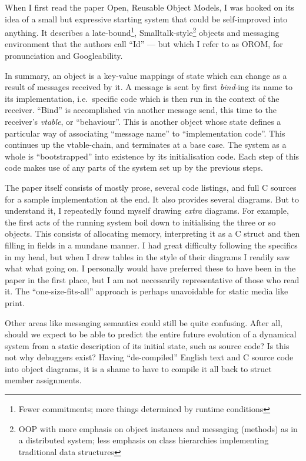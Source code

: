 \documentclass[english,submission]{programming}
\begin{document}
  When I first read the paper Open, Reusable Object Models, I was hooked
  on its idea of a small but expressive starting system that could be
  self-improved into anything. It describes a late-bound\footnote{Fewer
    commitments; more things determined by runtime conditions},
  Smalltalk-style\footnote{OOP with more emphasis on object instances and
    messaging (methods) as in a distributed system; less emphasis on class
    hierarchies implementing traditional data structures} objects and
  messaging environment that the authors call ``Id'' --- but which I refer
  to as OROM, for pronunciation and Googleability.

  In summary, an object is a key-value mappings of state which can change
  as a result of messages received by it. A message is sent by first
  \emph{bind}-ing its name to its implementation, i.e.~specific code which
  is then run in the context of the receiver. ``Bind'' is accomplished via
  another message send, this time to the receiver's \emph{vtable}, or
  ``behaviour''. This is another object whose state defines a particular
  way of associating ``message name'' to ``implementation code''. This
  continues up the vtable-chain, and terminates at a base case. The system
  as a whole is ``bootstrapped'' into existence by its initialisation
  code. Each step of this code makes use of any parts of the system set up
  by the previous steps.

  The paper itself consists of mostly prose, several code listings, and
  full C sources for a sample implementation at the end. It also provides
  several diagrams. But to understand it, I repeatedly found myself
  drawing \emph{extra} diagrams. For example, the first acts of the
  running system boil down to initialising the three or so objects. This
  consists of allocating memory, interpreting it as a C struct and then
  filling in fields in a mundane manner. I had great difficulty following
  the specifics in my head, but when I drew tables in the style of their
  diagrams I readily saw what what going on. I personally would have
  preferred these to have been in the paper in the first place, but I am
  not necessarily representative of those who read it. The
  ``one-size-fits-all'' approach is perhaps unavoidable for static media
  like print.

  Other areas like messaging semantics could still be quite confusing.
  After all, should we expect to be able to predict the entire future
  evolution of a dynamical system from a static description of its initial
  state, such as source code? Is this not why debuggers exist? Having
  ``de-compiled'' English text and C source code into object diagrams, it
  is a shame to have to compile it all back to struct member assignments.
\end{document}
